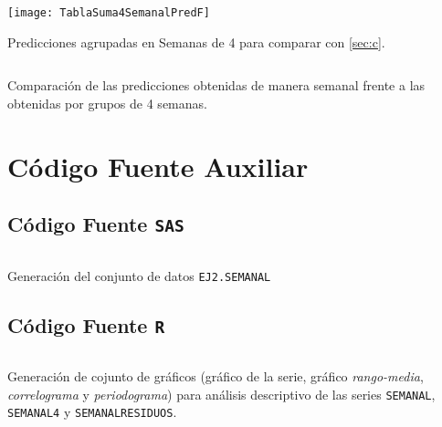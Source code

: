 \documentclass[a4paper, spanish]{article}
\begin{document}
    \begin{table}[htb!]
      \centering
      \texttt{[image: TablaSuma4SemanalPredF]}
      \caption{Predicciones agrupadas en Semanas de 4 para comparar con \autoref{sec:c}.}
      \label{table:pred_grouped_semanal}
    \end{table}

    \begin{listing}[htb!]
      \centering
      \inputminted{SAS}{./res/code/f-comparison.sas}
      \caption{Comparación de las predicciones obtenidas de manera semanal frente a las obtenidas por grupos de 4 semanas.}
      \label{code:f_comparison}
    \end{listing}

  \appendix
  \renewcommand{\thesection}{(\Roman{section})}
  \renewcommand\thesubsection{(\Roman{section}.\Roman{subsection})}

  \section{Código Fuente Auxiliar}
  \label{appendix:source_code}

    \subsection{Código Fuente \texttt{SAS}}
    \label{appendix:source_code_sas}

      \begin{listing}[H]
        \centering
        \inputminted{SAS}{./res/code/a-01-data.sas}
        \caption{Generación del conjunto de datos \texttt{EJ2.SEMANAL}}
        \label{code:data_import}
      \end{listing}


    \subsection{Código Fuente \texttt{R}}
    \label{appendix:source_code_r}

      \begin{listing}[H]
        \centering
        \inputminted{R}{./res/code/r/functions.r}
        \caption{Generación de cojunto de gráficos (gráfico de la serie, gráfico \emph{rango-media}, \emph{correlograma} y \emph{periodograma}) para análisis descriptivo de las series \texttt{SEMANAL}, \texttt{SEMANAL4} y \texttt{SEMANALRESIDUOS}.}
        \label{code:semanal_analysis}
      \end{listing}
\end{document}
